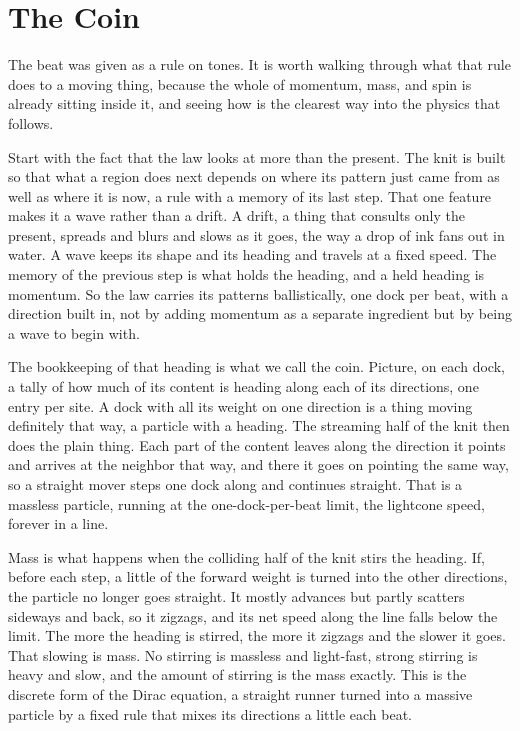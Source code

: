 \section{The Coin}

The beat was given as a rule on tones. It is worth walking through what that rule does to a moving thing, because the whole of momentum, mass, and spin is already sitting inside it, and seeing how is the clearest way into the physics that follows.

Start with the fact that the law looks at more than the present. The knit is built so that what a region does next depends on where its pattern just came from as well as where it is now, a rule with a memory of its last step. That one feature makes it a wave rather than a drift. A drift, a thing that consults only the present, spreads and blurs and slows as it goes, the way a drop of ink fans out in water. A wave keeps its shape and its heading and travels at a fixed speed. The memory of the previous step is what holds the heading, and a held heading is momentum. So the law carries its patterns ballistically, one dock per beat, with a direction built in, not by adding momentum as a separate ingredient but by being a wave to begin with.

The bookkeeping of that heading is what we call the coin. Picture, on each dock, a tally of how much of its content is heading along each of its directions, one entry per site. A dock with all its weight on one direction is a thing moving definitely that way, a particle with a heading. The streaming half of the knit then does the plain thing. Each part of the content leaves along the direction it points and arrives at the neighbor that way, and there it goes on pointing the same way, so a straight mover steps one dock along and continues straight. That is a massless particle, running at the one-dock-per-beat limit, the lightcone speed, forever in a line.

Mass is what happens when the colliding half of the knit stirs the heading. If, before each step, a little of the forward weight is turned into the other directions, the particle no longer goes straight. It mostly advances but partly scatters sideways and back, so it zigzags, and its net speed along the line falls below the limit. The more the heading is stirred, the more it zigzags and the slower it goes. That slowing is mass. No stirring is massless and light-fast, strong stirring is heavy and slow, and the amount of stirring is the mass exactly. This is the discrete form of the Dirac equation, a straight runner turned into a massive particle by a fixed rule that mixes its directions a little each beat.

